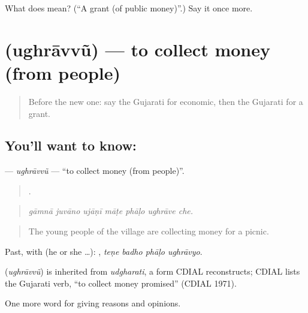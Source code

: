 \begin{tcolorbox}[breakable,colback=teal!4,colframe=teal!35!black,title={Before you move on}]
What does  mean? (\textquotedblleft{}A grant (of public money)\textquotedblright{}.) Say it once more.
\end{tcolorbox}
\section[\texorpdfstring{\gu{ઉઘરાવવું} (ughrāvvũ)}{ઉઘરાવવું (ughrāvvũ)}]{ (ughrāvvũ) — to collect money (from people)}

\label{lesson:GU-C355-ughravvu}



\begin{quote}
Before the new one: say the Gujarati for economic, then the Gujarati for a grant.
\end{quote}

\subsection*{You'll want to know: }
\textbf{} — \emph{ughrāvvũ} — \textquotedblleft{}to collect money (from people)\textquotedblright{}.

\begin{quote}
      .
\end{quote}

\begin{quote}
\emph{gāmnā juvāno ujāṇī māṭe phāḷo ughrāve che.}
\end{quote}

\begin{quote}
The young people of the village are collecting money for a picnic.
\end{quote}

Past, with  (he or she …):    , \emph{teṇe badho phāḷo ughrāvyo}.

\begin{cousinweb}
\textbf{} (\emph{ughrāvvũ}) is inherited from \emph{udgharati}, a form CDIAL reconstructs; CDIAL lists the Gujarati verb, \textquotedblleft{}to collect money promised\textquotedblright{} (CDIAL 1971).
\end{cousinweb}

\begin{grammarlens}[title={What you've built}]
One more word for giving reasons and opinions.
\end{grammarlens}

